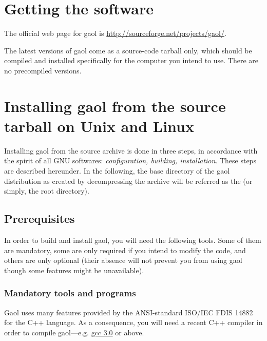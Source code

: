 \documentclass{manual}
\begin{document}
\section{Getting the software}

The official web page for gaol is \url{http://sourceforge.net/projects/gaol/}.
%

The latest versions of gaol come as a source-code tarball only, which should be compiled 
and installed specifically for the computer you intend to use. There are no precompiled 
versions.


\section{Installing gaol from the source tarball on Unix and Linux}
\label{sec:installing-gaol-unix}

Installing gaol from the source archive is done in three steps,
in accordance with the spirit of all GNU softwares: \emph{configuration,
building, installation}. These steps are described hereunder. In the
following, the base directory of the gaol distribution as created by
decompressing the archive will be referred as the  (or simply, the root directory).

\subsection{Prerequisites}
In order to build and install gaol, you will need the following
tools. Some of them are mandatory, some are only required if you
intend to modify the code, and others are only optional (their
absence will not prevent you from using gaol though some features might be
unavailable).

\subsubsection{Mandatory tools and programs}

Gaol uses many features provided by the ANSI-standard ISO/IEC FDIS 14882
for the C++ language. As a consequence, you will need a recent C++
compiler in order to compile gaol---e.g. \href{http://gcc.gnu.org}{gcc 3.0} or above.
%
%
\end{document}
